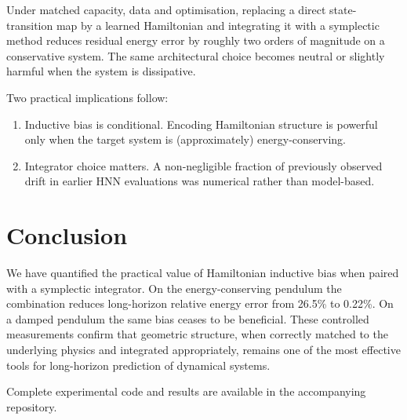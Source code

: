 \documentclass[11pt,a4paper]{article}
\begin{document}
Under matched capacity, data and optimisation, replacing a direct state-transition map by a learned Hamiltonian and integrating it with a symplectic method reduces residual energy error by roughly two orders of magnitude on a conservative system. The same architectural choice becomes neutral or slightly harmful when the system is dissipative.

Two practical implications follow:

\begin{enumerate}
  \item Inductive bias is conditional. Encoding Hamiltonian structure is powerful only when the target system is (approximately) energy-conserving.
  \item Integrator choice matters. A non-negligible fraction of previously observed drift in earlier HNN evaluations was numerical rather than model-based.
\end{enumerate}

\section{Conclusion}

We have quantified the practical value of Hamiltonian inductive bias when paired with a symplectic integrator. On the energy-conserving pendulum the combination reduces long-horizon relative energy error from 26.5\% to 0.22\%. On a damped pendulum the same bias ceases to be beneficial. These controlled measurements confirm that geometric structure, when correctly matched to the underlying physics and integrated appropriately, remains one of the most effective tools for long-horizon prediction of dynamical systems.

Complete experimental code and results are available in the accompanying repository.
\end{document}
